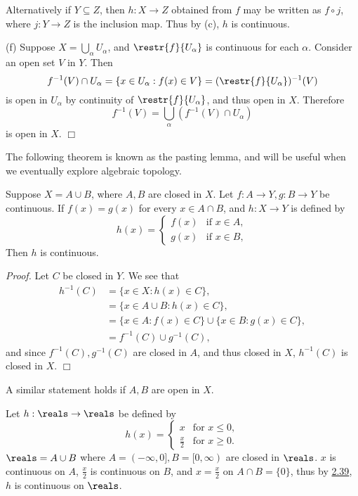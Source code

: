 Alternatively if $Y \subseteq Z$, then $h: X \rightarrow Z$ obtained from $f$ may be written as $f \circ j$, where $j: Y \rightarrow Z$ is the inclusion map. Thus by (c), $h$ is continuous.

(f) Suppose $X = \bigcup_\alpha U_\alpha$, and $\restr{f}{U_\alpha}$ is continuous for each $\alpha$. Consider an open set $V$ in $Y$. Then
$$f^{-1}(V) \cap U_\alpha = \{x \in U_\alpha: f(x) \in V\} = (\restr{f}{U_\alpha})^{-1}(V)$$
is open in $U_\alpha$ by continuity of $\restr{f}{U_\alpha}$, and thus open in $X$. Therefore
$$f^{-1}(V) = \bigcup_\alpha (f^{-1}(V) \cap U_\alpha)$$
is open in $X$. $\Box$

The following theorem is known as the pasting lemma, and will be useful when we eventually explore algebraic topology.
\begin{theorem}\label{2.39}
    Suppose $X = A \cup B$, where $A, B$ are closed in $X$. Let $f: A \rightarrow Y, g: B \rightarrow Y$ be continuous. If $f(x) = g(x)$ for every $x \in A \cap B$, and $h: X \rightarrow Y$ is defined by
    $$h(x) = \begin{cases}
        f(x) &\text{if } x \in A, \\
        g(x) &\text{if } x\in B,
    \end{cases}$$
    Then $h$ is continuous.
\end{theorem}
{\it Proof.} Let $C$ be closed in $Y$. We see that
\begin{align*}
    h^{-1}(C) &= \{x \in X: h(x) \in C\}, \\
    &= \{x \in A \cup B: h(x) \in C\}, \\
    &= \{x \in A: f(x) \in C\} \cup \{x \in B: g(x) \in C\}, \\
    &= f^{-1}(C) \cup g^{-1}(C),
\end{align*}
and since $f^{-1}(C), g^{-1}(C)$ are closed in $A$, and thus closed in $X$, $h^{-1}(C)$ is closed in $X$. $\Box$

A similar statement holds if $A, B$ are open in $X$.

Let $h: \reals \rightarrow \reals$ be defined by
$$h(x) = \begin{cases}
    x &\text{for } x \leq 0, \\
    \frac{x}{2} &\text{for } x \geq 0.
\end{cases}$$
$\reals = A \cup B$ where $A = (-\infty, 0], B = [0, \infty)$ are closed in $\reals$. $x$ is continuous on $A$, $\frac{x}{2}$ is continuous on $B$, and $x = \frac{x}{2}$ on $A \cap B = \{0\}$, thus by \hyperref[2.39]{2.39}, $h$ is continuous on $\reals$.


